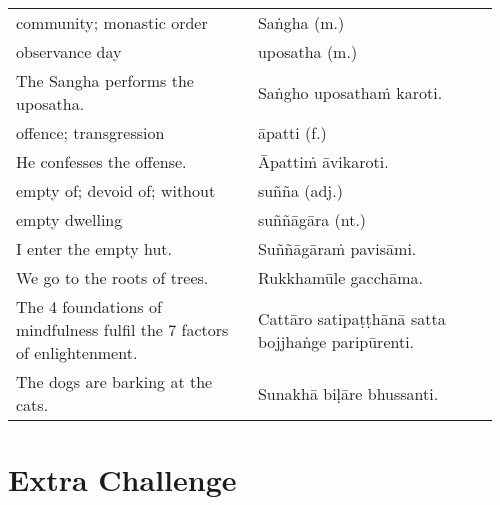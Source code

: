 \documentclass[a5paper]{memoir}
\begin{document}
\begin{longtable}{L{0.48\linewidth} L{0.48\linewidth}}
community; monastic order & Saṅgha (m.)\\[0pt]
observance day & uposatha (m.)\\[0pt]
The Sangha performs the uposatha. & Saṅgho uposathaṁ karoti.\\[0pt]
offence; transgression & āpatti (f.)\\[0pt]
He confesses the offense. & Āpattiṁ āvikaroti.\\[0pt]
empty of; devoid of; without & suñña (adj.)\\[0pt]
empty dwelling & suññāgāra (nt.)\\[0pt]
I enter the empty hut. & Suññāgāraṁ pavisāmi.\\[0pt]
We go to the roots of trees. & Rukkhamūle gacchāma.\\[0pt]
The 4 foundations of mindfulness fulfil the 7 factors of enlightenment. & Cattāro satipaṭṭhānā satta bojjhaṅge paripūrenti.\\[0pt]
The dogs are barking at the cats. & Sunakhā biḷāre bhussanti.\\[0pt]
\end{longtable}

\chapter{Extra Challenge}
\label{sec:org88b0200}
\end{document}
